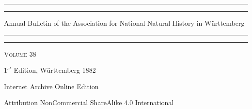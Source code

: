 \documentclass[a4paper, 12pt, oneside]{article}
\begin{document}
\begin{titlepage} %
	\centering %
	\scshape %

	
	\rule{\textwidth}{1.6pt}\vspace*{-\baselineskip}\vspace*{2pt} %
	\rule{\textwidth}{0.4pt} %
	
	\vspace{0.75\baselineskip} %
	
	{\LARGE Annual Bulletin of the Association for National Natural History in Württemberg\\}
	
	\vspace{0.75\baselineskip} %
	
	\rule{\textwidth}{0.4pt}\vspace*{-\baselineskip}\vspace{3.2pt} %
	\rule{\textwidth}{1.6pt} %
	
	\vspace{1\baselineskip} %
	
	
	{\scshape\Large Volume 38\\} %
	
	\vspace*{1\baselineskip} %
	
    

	
		
	\vspace*{\fill}%
	
	
	{\small 1$^{st}$ Edition, Württemberg 1882} %

	\vspace{1\baselineskip} %

    Internet Archive Online Edition  %
	
	{\small Attribution NonCommercial ShareAlike 4.0 International } %
\end{titlepage}
\setlength{\parskip}{1mm plus1mm minus1mm}
\clearpage
\tableofcontents
\clearpage
\end{document}
